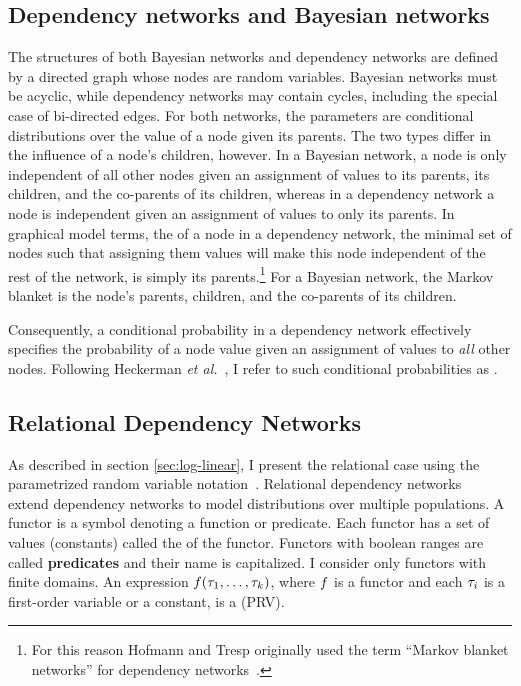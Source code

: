 \documentclass{sfuthesis}
\newcommand{\etal}{\textit{et al.}}
\begin{document}
 \subsection{Dependency networks and Bayesian networks} 
The structures of both Bayesian networks and dependency networks are defined by a directed graph whose nodes are random variables. Bayesian networks must be acyclic, while dependency networks may contain cycles, including the special case of bi-directed edges. For both networks, the parameters are conditional distributions over the value of a node given its parents. The two types differ in the  influence of a node's children, however. In a Bayesian network, a node is only independent of all other nodes given an assignment of values to its parents, its children, and the co-parents of its children, whereas in a dependency network a node is independent given an assignment of values to only its parents. In graphical model terms, the  of a node in a dependency network, the minimal set of nodes such that assigning them values will make this node independent of the rest of the network, is simply its parents.\footnote{For this reason Hofmann and Tresp originally used the term ``Markov blanket networks'' for dependency networks~\cite{Hofmann1998}.}
For a Bayesian network, the Markov blanket is the node's parents, children, and the co-parents of its children.

Consequently, a conditional probability in a dependency network effectively specifies the probability of a node value given an assignment of values to {\em all} other nodes. 
Following Heckerman \etal{}~\cite{Heckerman2000}, I  refer to such conditional probabilities as .


\subsection{Relational Dependency Networks}\label{sec:rdns}


As described in section \ref{sec:log-linear}, I  present the relational case using the parametrized random variable notation~\cite{Kimmig2015}.
Relational dependency networks~\cite{Neville2007} extend dependency networks to model distributions over multiple populations.
A functor is a symbol denoting a function or predicate. Each functor has a set of values (constants) called the  of the functor. Functors with boolean ranges are called \textbf{predicates} and their name is capitalized. I  consider only functors with finite domains. An expression $f(\tau_{1},\ldots,\tau_{k})$, where $f$ is a functor and each $\tau_{i}$ is a first-order variable or a constant, is a  (PRV).
 
\end{document}
